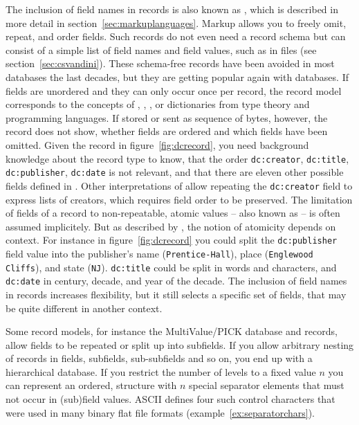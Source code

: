 The inclusion of field names in records is also known as , which
is described in more detail in section~\ref{sec:markuplanguages}. Markup allows
you to freely omit, repeat, and order fields. Such records do not even need a
record schema but can consist of a simple list of field names and field values,
such as in  files (see section~\ref{sec:csvandini}). These
schema-free records have been avoided in most databases the last decades, but
they are getting popular again with  databases. If fields are
unordered and they can only occur once per record, the record model corresponds
to the concepts of , , ,
or dictionaries from type theory and programming languages. If stored or sent
as sequence of bytes, however, the record does not show, whether fields are
ordered and which fields have been omitted. Given the record in
figure~\ref{fig:dcrecord}, you need background knowledge about the record type
 to know, that the order
\verb|dc:creator|, \verb|dc:title|, \verb|dc:publisher|, \verb|dc:date| is not
relevant, and that there are eleven other possible fields defined in
.  Other interpretations of  allow repeating the
\verb|dc:creator| field to express lists of creators, which requires field
order to be preserved.  The limitation of fields of a record to non-repeatable,
atomic values -- also known as  -- is often assumed
implicitely. But as described by \textcite{Fotache2006}, the notion of
atomicity depends on context.  For instance in figure~\ref{fig:dcrecord} you
could split the \verb|dc:publisher| field value into the publisher's name
(\verb|Prentice-Hall|), place (\verb|Englewood Cliffs|), and state (\verb|NJ|).
\verb|dc:title| could be split in words and characters, and \verb|dc:date| in
century, decade, and year of the decade. The inclusion of field names in
records increases flexibility, but it still selects a specific set of fields,
that may be quite different in another context.

Some record models, for instance the MultiValue/PICK database and 
records, allow fields to be repeated or split up into subfields. If you allow
arbitrary nesting of records in fields, subfields, sub-subfields and so on, you
end up with a hierarchical database. If you restrict the number of levels to a
fixed value $n$ you can represent an ordered, 
structure with $n$ special separator elements that must not occur in (sub)field
values. ASCII defines four such control characters that were used in many
binary flat file formats (example~\ref{ex:separatorchars}).

